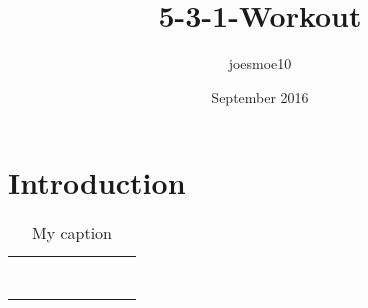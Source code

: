 \documentclass[landscape]{article}
\title{5-3-1-Workout}
\author{joesmoe10 }
\date{September 2016}
\begin{document}
\maketitle

\section{Introduction}

\begin{table}[]
\centering
\caption{My caption}
\label{my-label}
\begin{tabular}{@{}llllllll@{}}
\multicolumn{2}{l}{} & \multicolumn{2}{l}{} & \multicolumn{2}{l}{} & \multicolumn{2}{l}{} \\
\multicolumn{2}{l}{} & \multicolumn{2}{l}{} & \multicolumn{2}{l}{} & \multicolumn{2}{l}{} \\
          &          &           &          &           &          &           &          \\
          &          &           &          &           &          &           &          \\
          &          &           &          &           &          &           &          \\
          &          &           &          &           &          &           &          \\
          &          &           &          &           &          &           &         
\end{tabular}
\end{table}
\end{document}
